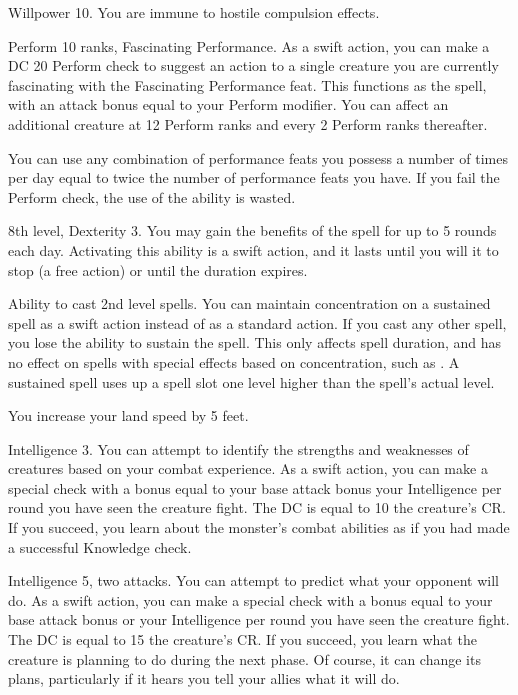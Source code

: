\featpre Willpower 10.
\featben You are immune to hostile compulsion effects.

\featpres Perform 10 ranks, Fascinating Performance.
\featben As a swift action, you can make a DC 20 Perform check to suggest an action to a single creature you are currently fascinating with the Fascinating Performance feat.
This functions as the 
spell, with an attack bonus equal to your Perform modifier.
You can affect an additional creature at 12 Perform ranks and every 2 Perform ranks thereafter.

You can use any combination of performance feats you possess a number of times per day equal to twice the number of performance feats you have.
If you fail the Perform check, the use of the ability is wasted.

\featpres 8th level, Dexterity 3.
\featben You may gain the benefits of the 
spell for up to 5 rounds each day.
Activating this ability is a swift action, and it lasts until you will it to stop (a free action) or until the duration expires.

\featpre Ability to cast 2nd level spells.
\featben You can maintain concentration on a sustained spell as a swift action instead of as a standard action.
If you cast any other spell, you lose the ability to sustain the spell.
This only affects spell duration, and has no effect on spells with special effects based on concentration, such as .
A sustained spell uses up a spell slot one level higher than the spell's actual level.

\featben You increase your land speed by 5 feet.

\featpre Intelligence 3.
\featben You can attempt to identify the strengths and weaknesses of creatures based on your combat experience.
As a swift action, you can make a special check with a bonus equal to your base attack bonus \add your Intelligence  per round you have seen the creature fight.
The DC is equal to 10 \add the creature's CR.
If you succeed, you learn about the monster's combat abilities as if you had made a successful Knowledge check.

\featpres Intelligence 5, two attacks.
\featben You can attempt to predict what your opponent will do.
As a swift action, you can make a special check with a bonus equal to your base attack bonus or your Intelligence  per round you have seen the creature fight.
The DC is equal to 15 \add the creature's CR.
If you succeed, you learn what the creature is planning to do during the next phase.
Of course, it can change its plans, particularly if it hears you tell your allies what it will do.

